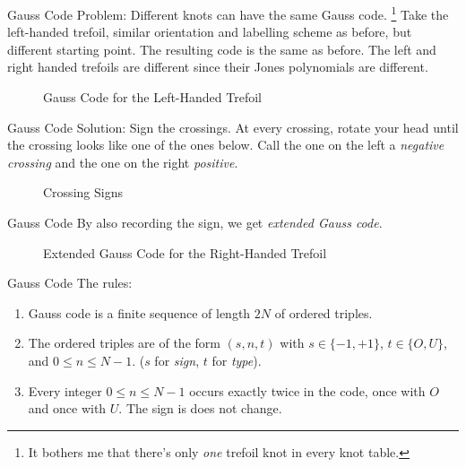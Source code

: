 \documentclass{beamer}
\begin{document}
    \begin{frame}{Gauss Code}
        Problem: Different knots can have the same Gauss code.%
        \footnote{%
            It bothers me that there's only \textit{one} trefoil knot in every
            knot table.
        }
        Take the left-handed trefoil, similar orientation and labelling scheme
        as before, but different starting point. The resulting code is the same
        as before. The left and right handed trefoils are different since
        their Jones polynomials are different.
        \begin{figure}
            \centering
            \caption{Gauss Code for the Left-Handed Trefoil}
            \label{fig:left_handed_trefoil_gauss_code}
        \end{figure}
    \end{frame}
    \begin{frame}{Gauss Code}
        Solution: Sign the crossings. At every crossing, rotate your head until
        the crossing looks like one of the ones below. Call the one on the left
        a \textit{negative crossing} and the one on the right \textit{positive}.
        \begin{figure}
            \centering
            \caption{Crossing Signs}
            \label{fig:crossing_signs}
        \end{figure}
    \end{frame}
    \begin{frame}{Gauss Code}
        By also recording the sign, we get \textit{extended Gauss code}.
        \begin{figure}
            \centering
            \caption{Extended Gauss Code for the Right-Handed Trefoil}
            \label{fig:right_hand_trefoil_extended_gauss}
        \end{figure}
    \end{frame}
    \begin{frame}{Gauss Code}
        The rules:
        \begin{enumerate}
            \item Gauss code is a finite sequence of length $2N$ of ordered
                  triples.
            \item The ordered triples are of the form $(s,n,t)$ with
                  $s\in\{-1,+1\}$, $t\in\{O,U\}$, and $0\leq{n}\leq{N-1}$.
                  ($s$ for \textit{sign}, $t$ for \textit{type}).
            \item Every integer $0\leq{n}\leq{N-1}$ occurs exactly twice in the
                  code, once with $O$ and once with $U$. The sign is does not
                  change.
        \end{enumerate}
    \end{frame}
\end{document}
